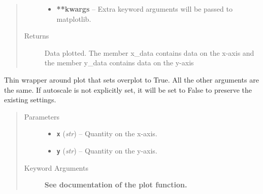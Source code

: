 \documentclass[letterpaper,10pt,english]{sphinxmanual}
\begin{document}
\begin{fulllineitems}
\begin{quote}
\begin{description}
\begin{itemize}
\item {} 
\textbf{**kwargs} --
Extra keyword arguments will be passed to matplotlib.

\end{itemize}

\item[{Returns}] \leavevmode
Data plotted. The member x\_data contains data on the x-axis and the member y\_data
contains data on the y-axis

\end{description}\end{quote}

\end{fulllineitems}


\begin{fulllineitems}
\label{index:facade.addplot}
Thin wrapper around plot that sets overplot to True.  All the other
arguments are the same. If autoscale is not explicitly set, it will be set
to False to preserve the existing settings.
\begin{quote}\begin{description}
\item[{Parameters}] \leavevmode\begin{itemize}
\item {} 
\textbf{\texttt{x}} (\emph{str}) -- Quantity on the x-axis.

\item {} 
\textbf{\texttt{y}} (\emph{str}) -- Quantity on the y-axis.

\end{itemize}

\item[{Keyword Arguments}] \leavevmode
\textbf{See documentation of the plot function.}

\end{description}\end{quote}

\end{fulllineitems}

\end{document}
